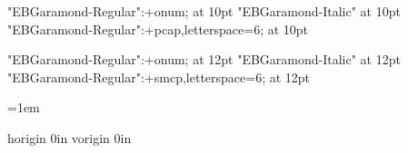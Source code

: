 




\font\tenrm "EBGaramond-Regular":+onum; at 10pt\relax
\font\tenit "EBGaramond-Italic" at 10pt\relax
\font\tensc "EBGaramond-Regular":+pcap,letterspace=6; at 10pt\relax

\font\twelverm "EBGaramond-Regular":+onum; at 12pt\relax
\font\twelveit "EBGaramond-Italic" at 12pt\relax
\font\twelvesc "EBGaramond-Regular":+smcp,letterspace=6; at 12pt\relax

\def\normalsize{%
	\gdef\rm{\tenrm}%
	\gdef\it{\tenit}%
	\gdef\sc{\tensc}%
}

\def\headingIsize{%
	\gdef\rm{\twelverm}%
	\gdef\it{\twelveit}%
	\gdef\sc{\twelvesc}%
}

\let\emph\it

\normalsize\rm



\baselineskip=15pt

\frenchspacing

\parskip=0pt

\parindent=1em

\emergencystretch=8pt

\def\firstnoindent{\global\everypar={\wipeeverypar\setbox7=\lastbox}}
\def\wipeeverypar{\global\everypar={}}

{}


\pagewidth=148mm	
\pageheight=210mm

\pdfvariable horigin 0in	
\pdfvariable vorigin 0in

\hoffset=16.444mm	
\voffset=16.444mm

